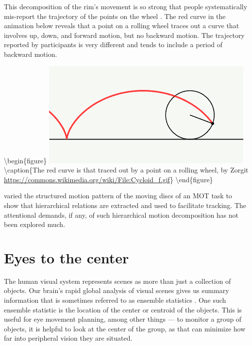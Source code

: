 \documentclass[
]{book}
\begin{document}
This decomposition of the rim's movement is so strong that people systematically mis-report the trajectory of the points on the wheel \citep{proffittUnderstandingWheelDynamics1990}. The red curve in the animation below reveals that a point on a rolling wheel traces out a curve that involves up, down, and forward motion, but no backward motion. The trajectory reported by participants is very different and tends to include a period of backward motion.

\textbackslash begin\{figure\}
\includegraphics[width=0.3\linewidth]{movies/cycloid/Cycloid_f_static} \textbackslash caption\{The red curve is that traced out by a point on a rolling wheel, by Zorgit \url{https://commons.wikimedia.org/wiki/File:Cycloid_f.gif}\}\label{fig:unnamed-chunk-5}
\textbackslash end\{figure\}

\citet{billHierarchicalStructureEmployed2020} varied the structured motion pattern of the moving discs of an MOT task to show that hierarchical relations are extracted and used to facilitate tracking. The attentional demands, if any, of such hierarchical motion decomposition has not been explored much.

\hypertarget{eyes-to-the-center}{%
\section{Eyes to the center}\label{eyes-to-the-center}}

The human visual system represents scenes as more than just a collection of objects. Our brain's rapid global analysis of visual scenes gives us summary information that is sometimes referred to as ensemble statistics \citep{alvarezSpatialEnsembleStatistics2009}. One such ensemble statistic is the location of the center or centroid of the objects. This is useful for eye movement planning, among other things --- to monitor a group of objects, it is helpful to look at the center of the group, as that can minimize how far into peripheral vision they are situated.
\end{document}
